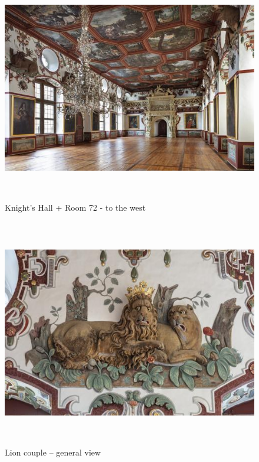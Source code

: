 \documentclass[
  a4paper,
  openany]{book}
\begin{document}
\begin{figure}[H]
\centering
\includegraphics[height=10cm]{./images/fmd10005862a.jpg}
\caption{Knight's Hall + Room 72 - to the west}
\label{fig:{https://previous.bildindex.de/bilder/fmd10005862a.jpg}}
\end{figure}

\clearpage

\begin{figure}[H]
\centering
\includegraphics[height=10cm]{./images/fmd10005864a.jpg}
\caption{Lion couple – general view}
\label{fig:{https://previous.bildindex.de/bilder/fmd10005864a.jpg}}
\end{figure}

\clearpage
\end{document}
